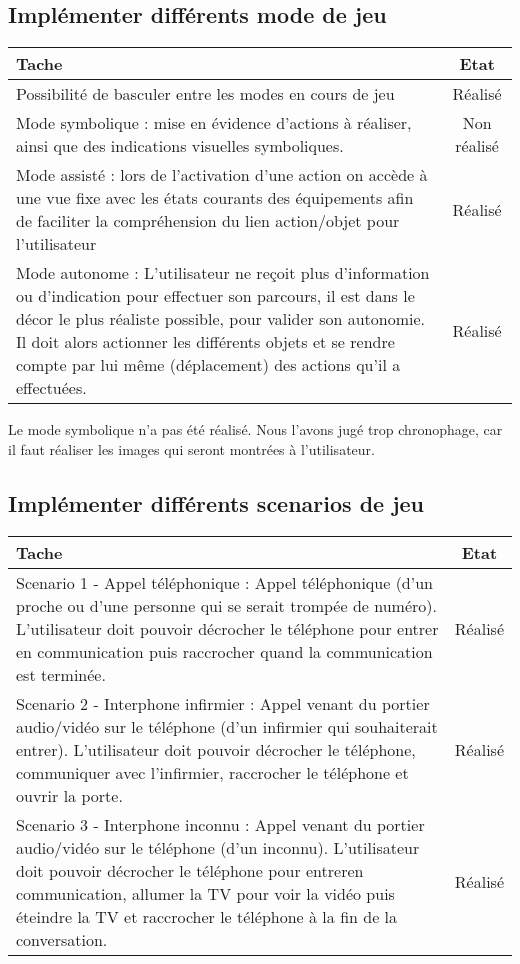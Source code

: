 \subsection{Implémenter différents mode de jeu}
\begin{tabular}{|p{13cm}|c|}
	\hline
	Tache & Etat \\ \hline
	Possibilité de basculer entre les modes en cours de jeu & Réalisé \\ \hline
	Mode symbolique : mise en évidence d'actions à réaliser, ainsi que des indications visuelles symboliques. & Non réalisé \\ \hline
	Mode assisté : lors de l'activation d'une action on accède à une vue fixe avec les états courants des équipements afin de faciliter la compréhension du lien action/objet pour l'utilisateur & Réalisé \\ \hline
	Mode autonome : L'utilisateur ne reçoit plus d'information ou d'indication pour effectuer son parcours, il est dans le décor le plus réaliste possible, pour valider son autonomie. Il doit alors actionner les différents objets et se rendre compte par lui même (déplacement) des actions qu'il a effectuées.  & Réalisé \\ \hline
\end{tabular}
Le mode symbolique n'a pas été réalisé. Nous l'avons jugé trop chronophage, car il faut réaliser les images qui seront montrées à l'utilisateur. 	

\subsection{Implémenter différents scenarios de jeu}		
\begin{tabular}{|p{13cm}|c|}
	\hline
	Tache & Etat \\ \hline
	Scenario 1 - Appel téléphonique : Appel téléphonique (d'un proche ou d'une personne qui se serait trompée de numéro). L'utilisateur doit pouvoir décrocher le téléphone pour entrer en communication puis raccrocher quand la communication est terminée. & Réalisé \\ \hline
	Scenario 2 - Interphone infirmier : Appel venant du portier audio/vidéo sur le téléphone (d'un infirmier qui souhaiterait entrer). L'utilisateur doit pouvoir décrocher le téléphone, communiquer avec l'infirmier, raccrocher le téléphone et ouvrir la porte.& Réalisé \\ \hline
	Scenario 3 - Interphone inconnu : Appel venant du portier audio/vidéo sur le téléphone (d'un inconnu). L'utilisateur doit pouvoir décrocher le téléphone pour entreren communication, allumer la TV pour voir la vidéo puis éteindre la TV et raccrocher le téléphone à la fin de la conversation.& Réalisé \\ \hline
\end{tabular}
		

